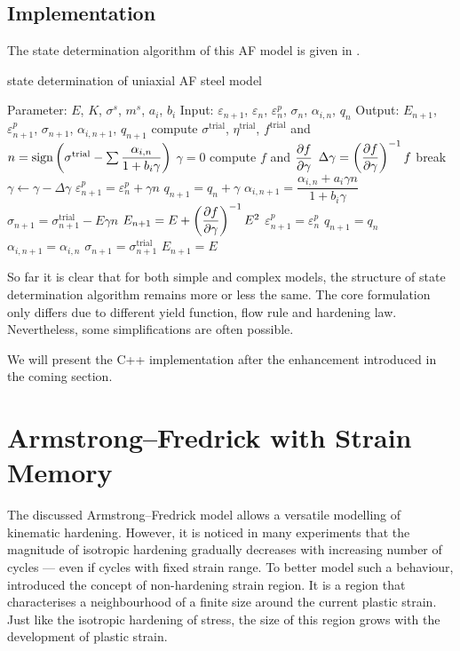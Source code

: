 \subsection{Implementation}
The state determination algorithm of this AF model is given in .
\begin{breakablealgorithm}
\caption{state determination of uniaxial AF steel model}\label{algo:af_steel}
\begin{algorithmic}[1]
\State Parameter: $E$, $K$, $\sigma^s$, $m^s$, $a_i$, $b_i$
\State Input: $\varepsilon_{n+1}$, $\varepsilon_n$, $\varepsilon^p_n$, $\sigma_n$, $\alpha_{i,n}$, $q_n$
\State Output: $E_{n+1}$, $\varepsilon^p_{n+1}$, $\sigma_{n+1}$, $\alpha_{i,n+1}$, $q_{n+1}$
\State compute $\sigma^\text{trial}$, $\eta^\text{trial}$, $f^\text{trial}$ and $n=\text{sign}\left(\sigma^\text{trial}-\sum\dfrac{\alpha_{i,n}}{1+b_i\gamma}\right)$
\State $\gamma=0$
\State compute $f$ and $\dfrac{\partial{f}}{\partial{\gamma}}$
\State $\Delta\gamma=\left(\dfrac{\partial{f}}{\partial{\gamma}}\right)^{-1}f$
\State break
\EndIf
\State $\gamma\leftarrow\gamma-\Delta\gamma$
\EndWhile
\State $\varepsilon^p_{n+1}=\varepsilon^p_n+\gamma{}n$
\State $q_{n+1}=q_n+\gamma$
\State $\alpha_{i,n+1}=\dfrac{\alpha_{i,n}+a_i\gamma{}n}{1+b_i\gamma}$
\State $\sigma_{n+1}=\sigma_{n+1}^\text{trial}-E\gamma{}n$
\State $E_{n+1}=E+\left(\dfrac{\partial{f}}{\partial{\gamma}}\right)^{-1}E^2$
\Else
\State $\varepsilon^p_{n+1}=\varepsilon^p_n$
\State $q_{n+1}=q_n$
\State $\alpha_{i,n+1}=\alpha_{i,n}$
\State $\sigma_{n+1}=\sigma_{n+1}^\text{trial}$
\State $E_{n+1}=E$
\EndIf
\end{algorithmic}
\end{breakablealgorithm}

So far it is clear that for both simple and complex models, the structure of state determination algorithm remains more or less the same. The core formulation only differs due to different yield function, flow rule and hardening law. Nevertheless, some simplifications are often possible.

We will present the C++ implementation after the enhancement introduced in the coming section.
\section{Armstrong--Fredrick with Strain Memory}
The discussed Armstrong--Fredrick model allows a versatile modelling of kinematic hardening.
However, it is noticed in many experiments that the magnitude of isotropic hardening gradually decreases with increasing number of cycles --- even if cycles with fixed strain range.
To better model such a behaviour, \cite{Ohno1982} introduced the concept of non-hardening strain region.
It is a region that characterises a neighbourhood of a finite size around the current plastic strain. Just like the isotropic hardening of stress, the size of this region grows with the development of plastic strain.
